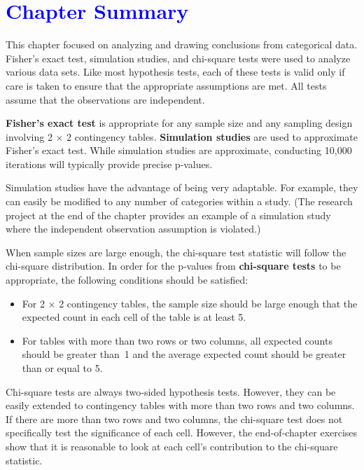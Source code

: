 \documentclass[
]{report}
\providecommand{\tightlist}{%
  \setlength{\itemsep}{0pt}\setlength{\parskip}{0pt}}
\begin{document}
\hypertarget{section-59}{%
\section{\texorpdfstring{\textcolor{blue}{Chapter Summary}}{}}\label{section-59}}

This chapter focused on analyzing and drawing conclusions from categorical data. Fisher's exact test, simulation studies, and chi-square tests were used to analyze various data sets. Like most hypothesis tests, each of these tests is valid only if care is taken to ensure that the appropriate assumptions are met. All tests assume that the observations are independent.

\textbf{Fisher's exact test} is appropriate for any sample size and any sampling design involving 2 × 2 contingency tables. \textbf{Simulation studies} are used to approximate Fisher's exact test. While simulation studies are approximate, conducting 10,000 iterations will typically provide precise p‑values.

Simulation studies have the advantage of being very adaptable. For example, they can easily be modified to any number of categories within a study. (The research project at the end of the chapter provides an example of a simulation study where the independent observation assumption is violated.)

When sample sizes are large enough, the chi-square test statistic will follow the chi-square distribution. In order for the p‑values from \textbf{chi-square tests} to be appropriate, the following conditions should be satisfied:

\begin{itemize}
\tightlist
\item
  For 2 × 2 contingency tables, the sample size should be large enough that the expected count in each cell of the table is at least 5.
\item
  For tables with more than two rows or two columns, all expected counts should be greater than~1 and the average expected count should be greater than or equal to 5.
\end{itemize}

Chi-square tests are always two‑sided hypothesis tests. However, they can be easily extended to contingency tables with more than two rows and two columns. If there are more than two rows and two columns, the chi-square test does not specifically test the significance of each cell. However, the end‑of‑chapter exercises show that it is reasonable to look at each cell's contribution to the chi-square statistic.
\end{document}
